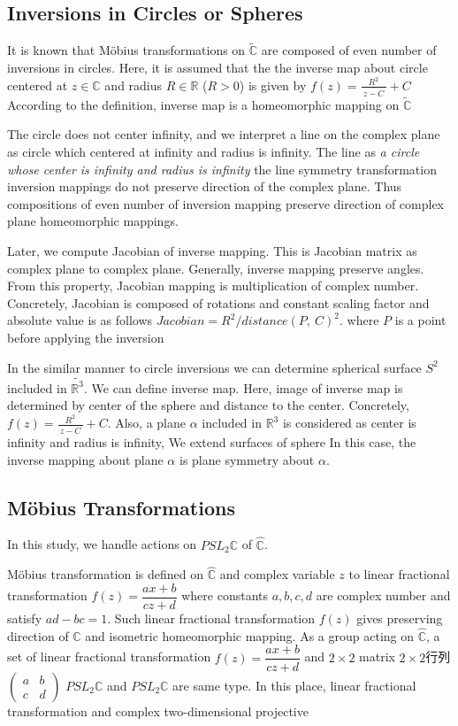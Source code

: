 \subsection{Inversions in Circles or Spheres}

It is known that M\"obius transformations on $\tilde{\mathbb{C}}$
are composed of even number of inversions in circles.
Here, it is assumed that the the inverse map about circle centered at 
$z\in\mathbb{C}$ and radius $R\in\mathbb{R}$ ($R>0$)
is given by
$f(z) = \frac{R^2}{~\overline{z -C}~} + C$
According to the definition, inverse map is a homeomorphic mapping on
$\tilde{\mathbb{C}}$ 

The circle does not center infinity, and we interpret a line on the
complex plane as circle which centered at infinity and radius is
infinity.
The line as \textit{a circle whose center is infinity and radius is
infinity}
the line symmetry transformation
inversion mappings do not preserve direction of the complex plane.
Thus compositions of even number of inversion mapping preserve direction
of complex plane homeomorphic mappings.

Later, we compute Jacobian of inverse mapping.
This is Jacobian matrix as complex plane to complex plane.
Generally, inverse mapping preserve angles.
From this property, Jacobian mapping is multiplication of complex
number.
Concretely, Jacobian is composed of rotations and constant scaling
factor and absolute value is as follows
$Jacobian = R^2 / distance(P,~C)^2$.
where $P$ is a point before applying the inversion

In the similar manner to circle inversions we can determine spherical
surface $S^2$ included in $\tilde{\mathbb{R}^3}$.
We can define inverse map.
Here, image of inverse map is determined by center of the sphere and
distance to the center. Concretely, $f(z) = \frac{R^2}{~\overline{z -C}~} + C$. 
Also, a plane $\alpha$ included in $\mathbb{R}^3$ is considered as
center is infinity and radius is infinity,
We extend surfaces of sphere
In this case, the inverse mapping about plane $\alpha$ is plane symmetry
about $\alpha$.

\subsection{M\"obius Transformations}

In this study, we handle actions on $PSL_2\mathbb{C}$ of $\hat{\mathbb{C}}$.

M\"obius transformation is defined on $\hat{\mathbb{C}}$ and 
complex variable $z$ to linear fractional transformation 
$f(z)=\dfrac{ax+b}{cz+d}$ where constants $a, b, c, d$ are complex
number and satisfy $ad - bc = 1$.
Such linear fractional transformation $f(z)$ gives preserving direction of
$\hat{\mathbb{C}}$ and isometric homeomorphic mapping.
As a group acting on $\hat{\mathbb{C}}$, a set of linear fractional
transformation $f(z) = \dfrac{ax + b}{cz + d}$ and $2 \times 2$ matrix
$2\times 2$行列$\begin{pmatrix}a & b \\ c& d \end{pmatrix}$
$PSL_2\mathbb{C}$ and $PSL_2\mathbb{C}$ are same type. 
In this place, linear fractional transformation and
complex two-dimensional
projective

